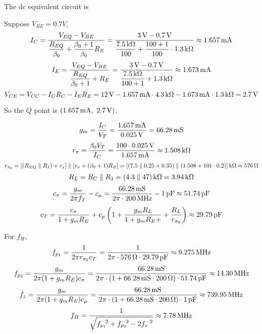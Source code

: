\documentclass{article}
\newcommand{\unit}[1]{{\rm\,#1}}
\begin{document}
\section{}

The dc equivalent circuit is
\begin{center}
\end{center}

Suppose $V_{BE}=0.7V$,
$$I_C=\frac{V_{EQ}-V_{BE}}{\dfrac{R_{EQ}}{\beta_0}+\dfrac{\beta_0+1}{\beta_0}R_E}=\frac{3\unit{V}-0.7\unit{V}}{\dfrac{7.5\unit{k\Omega}}{100}+\dfrac{100+1}{100}\cdot1.3\unit{k\Omega}}\approx1.657\unit{mA}$$
$$I_E=\frac{V_{EQ}-V_{BE}}{\dfrac{R_{EQ}}{\beta_0+1}+R_E}=\frac{3\unit{V}-0.7\unit{V}}{\dfrac{7.5\unit{k\Omega}}{100+1}+1.3\unit{k\Omega}}\approx1.673\unit{mA}$$
$$V_{CE}=V_{CC}-I_CR_C-I_ER_E=12\unit{V}-1.657\unit{mA}\cdot4.3\unit{k\Omega}-1.673\unit{mA}\cdot1.3\unit{k\Omega}=2.7\unit{V}$$

So the $Q$ point is $(1.657\unit{mA},\ 2.7\unit{V})$.

$$g_m=\frac{I_C}{V_T}=\frac{1.657\unit{mA}}{0.025\unit{V}}=66.28\unit{mS}$$
$$r_\pi=\frac{\beta_0V_T}{I_C}=\frac{100\cdot0.025\unit{V}}{1.657\unit{mA}}\approx1.508\unit{k\Omega}$$
$$r_{\pi_0}=[(R_{EQ}\parallel R_I)+r_x]\parallel[r_\pi+(\beta_0+1)R_E]=[(7.5\parallel 0.25+0.35)\parallel(1.508+101\cdot0.2)]\unit{k\Omega}\approx576\unit{\Omega}$$
$$R_L=R_C\parallel R_3=(4.3\parallel47)\unit{k\Omega}=3.94\unit{k\Omega}$$
$$c_\pi=\frac{g_m}{2\pi f_T}-c_\mu=\frac{66.28\unit{mS}}{2\pi\cdot200\unit{MHz}}-1\unit{pF}\approx51.74\unit{pF}$$
$$c_T=\frac{c_\pi}{1+g_mR_{E}}+c_\mu\left(1+\frac{g_mR_L}{1+g_mR_E+}+\frac{R_L}{r_{\pi_0}}\right)\approx29.79\unit{pF}$$

For $f_H$,
$$f_{p_1}=\frac{1}{2\pi r_{\pi_0}c_T}=\frac{1}{2\pi\cdot576\unit{\Omega}\cdot29.79\unit{pF}}\approx9.275\unit{MHz}$$
$$f_{p_2}=\frac{g_m}{2\pi(1+g_mR_E)c_\pi}=\frac{66.28\unit{mS}}{2\pi\cdot(1+66.28\unit{mS}\cdot200\unit{\Omega})\cdot51.74\unit{pF}}\approx14.30\unit{MHz}$$
$$f_{z}=\frac{g_m}{2\pi(1+g_mR_E)c_\mu}=\frac{66.28\unit{mS}}{2\pi\cdot(1+66.28\unit{mS}\cdot200\unit{\Omega})\cdot1\unit{pF}}\approx739.95\unit{MHz}$$
$$f_H=\frac{1}{\sqrt{f_{p_1}^{-2}+f_{p_2}^{-2}-2f_{z}^{-2}}}\approx7.78\unit{MHz}$$
\end{document}
